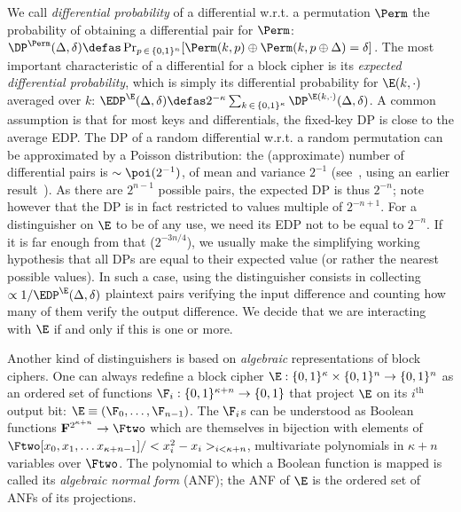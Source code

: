 We call \emph{differential probability} of a differential w.r.t. a permutation $\Perm$ the probability of obtaining a differential pair
for $\Perm$:
$\DP^{\Perm}(\Delta,\delta) \defas \Pr_{p\,\in\,\{0,1\}^n}[\Perm(k,p) \oplus \Perm(k,p \oplus \Delta) = \delta]$.
The most important characteristic of a differential for a block cipher is its \emph{expected differential probability}, which
is simply its differential probability for $\E(k,\cdot)$ averaged over $k$:
$\EDP^{\E}(\Delta,\delta) \defas 2^{-\kappa}\sum_{k\,\in\,\{0,1\}^\kappa} \DP^{\E(k,\cdot)}(\Delta,\delta)$.
A common assumption is that for most keys and differentials, the fixed-key DP is close to the average EDP.
The DP of a random differential w.r.t. a random permutation can be approximated by
a Poisson distribution: the (approximate) number of differential pairs is $\sim \poi(2^{-1})$, of mean and variance $2^{-1}$
(see~\cite{DBLP:journals/jmc/DaemenR07}, using an earlier result~\cite{DBLP:journals/joc/OConnor95}).
As there are $2^{n-1}$ possible pairs, the expected DP is thus $2^{-n}$; note however that the DP is in fact restricted to values multiple of $2^{-n+1}$.
For a distinguisher on $\E$ to be of any use, we need its EDP not to be equal to $2^{-n}$. If it is far enough
from that (\eg $2^{-3n/4}$), we usually make the simplifying working hypothesis that all DPs are equal to their expected value (or rather the nearest
possible values).
In such a case, using the distinguisher consists in collecting $\propto 1/\EDP^{\E}(\Delta,\delta)$ plaintext pairs verifying
the input difference and counting how many of them verify the output difference. We decide that we are interacting with $\E$ if and only if this is one or more.

\bigskip

Another kind of distinguishers is based on \emph{algebraic} representations of block ciphers. One can always redefine a block cipher
$\E : \{0,1\}^\kappa \times \{0,1\}^n \rightarrow \{0,1\}^n$ as an ordered set of functions $\F_i : \{0,1\}^{\kappa+n} \rightarrow \{0,1\}$ that project
$\E$ on its $i^\text{th}$ output bit: $\E \equiv (\F_0, \ldots, \F_{n-1})$. The $\F_i$s can be understood as Boolean functions
$\mathbf{F}^{2^{\kappa + n}} \rightarrow \Ftwo$ which are themselves in bijection with elements of $\Ftwo[x_0,x_1,\ldots x_{\kappa + n-1}]/<x_i^2-x_i>_{i<\kappa + n}$,
\ie multivariate polynomials in $\kappa + n$ variables over $\Ftwo$. The polynomial to which a Boolean function is mapped is called its \emph{algebraic normal form} (ANF);
the ANF of $\E$ is the ordered set of ANFs of its projections.


